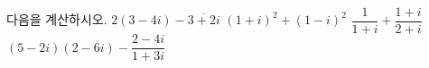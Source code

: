 다음을 계산하시오.
 $2(3-4i)-\overline{3+2i}$
 $(1+i)^2+(1-i)^2$
 $\dfrac{1}{1+i}+\dfrac{1+i}{2+i}$
 $(5-2i)(2-6i)-\dfrac{2-4i}{1+3i}$
